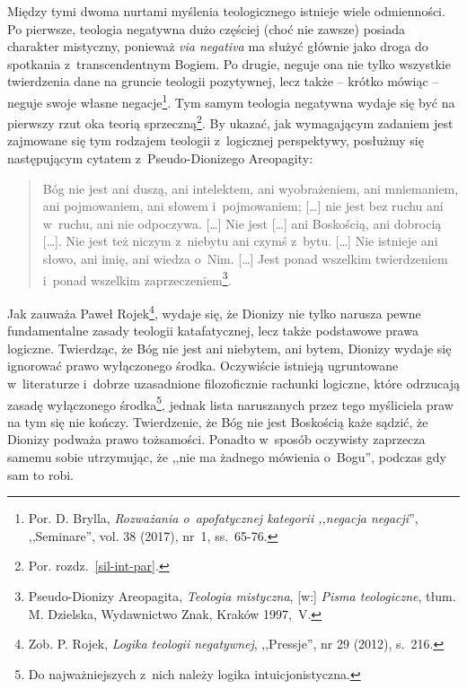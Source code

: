 Między tymi dwoma nurtami myślenia teologicznego istnieje wiele odmienności. Po pierwsze, teologia negatywna dużo częściej (choć nie zawsze) posiada charakter mistyczny, ponieważ \textit{via negativa} ma służyć głównie jako droga do spotkania z~transcendentnym Bogiem. Po drugie, neguje ona nie tylko wszystkie twierdzenia dane na gruncie teologii pozytywnej, lecz także -- krótko mówiąc -- neguje swoje własne negacje\footnote{Por. D. Brylla, \textit{Rozważania o~apofatycznej kategorii ,,negacja negacji}'', ,,Seminare'', vol. 38 (2017), nr~1, ss.~65-76.}. Tym samym teologia negatywna wydaje się być na pierwszy rzut oka teorią sprzeczną\footnote{Por. rozdz.~\ref{sil-int-par}.}. By ukazać, jak wymagającym zadaniem jest zajmowane się tym rodzajem teologii z~logicznej perspektywy, posłużmy się następującym cytatem z~Pseudo-Dionizego Areopagity:

\begin{quote}
Bóg nie jest ani duszą, ani intelektem, ani wyobrażeniem, ani mniemaniem, ani pojmowaniem, ani słowem i~pojmowaniem; [\ldots] nie jest bez ruchu ani w~ruchu, ani nie odpoczywa. [\ldots] Nie jest [\ldots] ani Boskością, ani dobrocią [\ldots]. Nie jest też niczym z~niebytu ani czymś z~bytu. [\ldots] Nie istnieje ani słowo, ani imię, ani wiedza o~Nim. [\ldots] Jest ponad wszelkim twierdzeniem i~ponad wszelkim zaprzeczeniem\footnote{Pseudo-Dionizy Areopagita, \textit{Teologia mistyczna}, [w:] \textit{Pisma teologiczne}, tłum. M. Dzielska, Wydawnictwo Znak, Kraków 1997,~V.}.
\end{quote}

Jak zauważa Paweł Rojek\footnote{Zob. P. Rojek, \textit{Logika teologii negatywnej}, ,,Pressje'', nr 29 (2012), s.~216.}, wydaje się, że Dionizy nie tylko narusza pewne fundamentalne zasady teologii katafatycznej, lecz także podstawowe prawa logiczne. Twierdząc, że Bóg nie jest ani niebytem, ani bytem, Dionizy wydaje się ignorować prawo wyłączonego środka. Oczywiście istnieją ugruntowane w~literaturze i~dobrze uzasadnione filozoficznie rachunki logiczne, które odrzucają zasadę wyłączonego środka\footnote{Do najważniejszych z~nich należy logika intuicjonistyczna.}, jednak lista naruszanych przez tego myśliciela praw na tym się nie kończy. Twierdzenie, że Bóg nie jest Boskością każe sądzić, że Dionizy podważa prawo tożsamości. Ponadto w~sposób oczywisty zaprzecza samemu sobie utrzymując, że ,,nie ma żadnego mówienia o~Bogu'', podczas gdy sam to robi.

